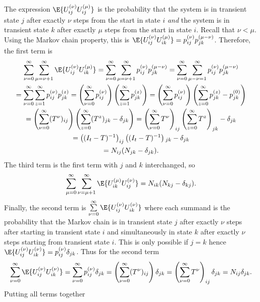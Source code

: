 \documentclass[12pt]{article}
\begin{document}
The expression \( \E{U_{ij}^{(\nu)} U_{ij}^{(\mu)}} \) is the probability
that the system is in transient state \( j \) after exactly \( \nu \)
steps from the start in state \( i \) \emph{and} the system is in
transient state \( k \) after exactly \( \mu \) steps from the start in
state \( i \).  Recall that \( \nu < \mu \). Using the Markov chain
property, this is \( \E{U_{ij}^{(\nu)} U_{ik}^{(\mu)}} = p_{ij}^{(\nu)} p_{jk}^
{(\mu-\nu)} \).  Therefore, the first term is
\begin{multline*}
    \sum\limits_{\nu=0}^{\infty} \sum\limits_{\mu=\nu+1}^{\infty} \E{U_{ij}^{(\nu)}
    U_{ik}^{(\mu)}} = \sum\limits_{\nu=0}^{\infty} \sum\limits_{\mu=\nu+1}^{\infty}
    p_{ij}^{(\nu)} p_{jk}^{(\mu-\nu)} = \sum\limits_{\nu=0}^{\infty} \sum\limits_
    {\mu-\nu=1}^{\infty} p_{ij}^{(\nu)} p_{jk}^{(\mu-\nu)} \\
    = \sum\limits_{\nu=0}^{\infty} \sum\limits_{z=1}^{\infty}
    p_{ij}^{(\nu)} p_{jk}^{(z)} = \left( \sum\limits_{\nu=0}^{\infty} p_{ij}^
    {(\nu)} \right) \left( \sum\limits_{z=1}^{\infty} p_{jk}^{(z)} \right)
    = \left( \sum\limits_{\nu=0}^{\infty} p_{ij}^{(\nu)} \right) \left( \sum\limits_
    {z=0}^{\infty} p_{jk}^{(z)} - p_{jk}^{(0)}\right) \\
    = \left( \sum\limits_{\nu=0}^{\infty} (T^\nu){}_{ij} \right) \left( \sum\limits_
    {z=0}^{\infty} (T^z){}_{jk} - \delta_{jk}\right) = \left( \sum\limits_
    {\nu=0}^{\infty} T^\nu \right)_{ij} \left( \sum\limits_{z=0}^{\infty} T^z\right)_
    {jk} - \delta_{jk} \\
    = \left( (I_t-T)^{-1} \right)_{ij} \left( (I_t-T)^{-1} \right){}_{jk}
    - \delta_{jk} \\
    = N_{ij}(N_{jk}-\delta_{jk}).
\end{multline*}
The third term is the first term with \( j \) and \( k \) interchanged,
so
\[
    \sum\limits_{\mu=0}^{\infty} \sum\limits_{\nu=\mu+1}^{\infty} \E{U_{ik}^{(\mu)}
    U_{ij}^{(\nu)}} = N_{ik}(N_{kj}-\delta_{kj}).
\] Finally, the second term is \( \sum\limits_{\nu=0}^{\infty} \E{U_{ij}^{%
(\nu)} U_{ik}^{(\nu)}} \) where each summand is the probability that the
Markov chain is in transient state \( j \) after exactly \( \nu \) steps
after starting in transient state \( i \) and simultaneously in state \(
k \) after exactly \( \nu \) steps starting from transient state \( i \).
This is only possible if \( j=k \) hence \( \E{U_{ij}^{(\nu)} U_{ik}^{(\nu)}}
= p_{ij}^{(\nu)} \delta_{jk} \).  Thus for the second term
\[
    \sum\limits_{\nu=0}^{\infty} \E{U_{ij}^{(\nu)} U_{ik}^{(\nu)}} = \sum\limits_
    {\nu=0}^ {\infty} p_{ij}^{(\nu)} \delta_{jk} = \left( \sum\limits_{\nu=0}^
    {\infty} (T^ {\nu}){}_{ij} \right) \delta_{jk} = \left( \sum\limits_{\nu=0}^
    {\infty} T^{\nu} \right)_{ij} \delta_{jk} = N_{ij} \delta_{jk}.
\] Putting all terms together
\end{document}

